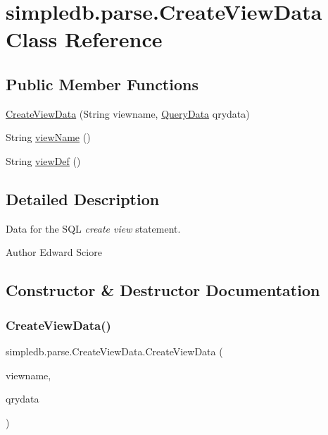 \hypertarget{classsimpledb_1_1parse_1_1CreateViewData}{}\section{simpledb.\+parse.\+Create\+View\+Data Class Reference}
\label{classsimpledb_1_1parse_1_1CreateViewData}
\subsection*{Public Member Functions}
\begin{DoxyCompactItemize}
\item 
\hyperlink{classsimpledb_1_1parse_1_1CreateViewData_ae35531a1ce18964e30a8e5fa934f3f73}{Create\+View\+Data} (String viewname, \hyperlink{classsimpledb_1_1parse_1_1QueryData}{Query\+Data} qrydata)
\item 
String \hyperlink{classsimpledb_1_1parse_1_1CreateViewData_a440e7e55b867ec68efbe3ec712de1e34}{view\+Name} ()
\item 
String \hyperlink{classsimpledb_1_1parse_1_1CreateViewData_a30dd4744cd1fa08352bc21d152a98208}{view\+Def} ()
\end{DoxyCompactItemize}


\subsection{Detailed Description}
Data for the S\+QL {\itshape create view} statement. \begin{DoxyAuthor}{Author}
Edward Sciore 
\end{DoxyAuthor}


\subsection{Constructor \& Destructor Documentation}
\mbox{\label{classsimpledb_1_1parse_1_1CreateViewData_ae35531a1ce18964e30a8e5fa934f3f73}} 
\subsubsection{\texorpdfstring{Create\+View\+Data()}{CreateViewData()}}
{\footnotesize\ttfamily simpledb.\+parse.\+Create\+View\+Data.\+Create\+View\+Data (\begin{DoxyParamCaption}\item[{String}]{viewname,  }\item[{\hyperlink{classsimpledb_1_1parse_1_1QueryData}{Query\+Data}}]{qrydata }\end{DoxyParamCaption})\hspace{0.3cm}{\ttfamily [inline]}}

